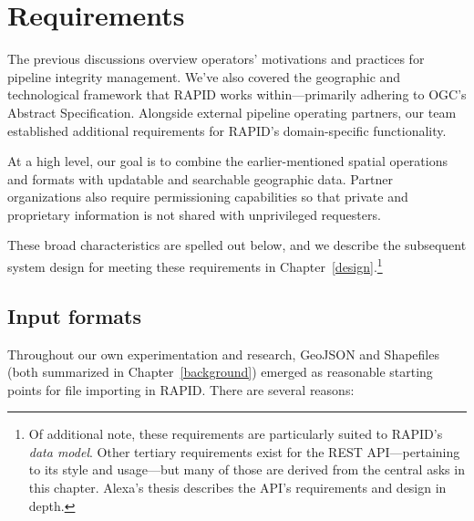 \chapter{Requirements}
\label{requirements}

The previous discussions overview operators' motivations and practices for pipeline integrity management. We've also covered the geographic and technological framework that RAPID works within---primarily adhering to OGC's Abstract Specification. Alongside external pipeline operating partners, our team established additional requirements for RAPID's domain-specific functionality.

At a high level, our goal is to combine the earlier-mentioned spatial operations and formats with updatable and searchable  geographic data. Partner organizations also require permissioning capabilities so that private and proprietary information is not shared with unprivileged requesters.

These broad characteristics are spelled out below, and we describe the subsequent system design for meeting these requirements in Chapter~\ref{design}.\footnote{Of additional note, these requirements are particularly suited to RAPID's \textit{data model}. Other tertiary requirements exist for the REST API---pertaining to its style and usage---but many of those are derived from the central asks in this chapter. Alexa's thesis describes the API's requirements and design in depth.}

\section{Input formats}

Throughout our own experimentation and research, GeoJSON and Shapefiles (both summarized in Chapter~\ref{background}) emerged as reasonable starting points for file importing in RAPID. There are several reasons:

